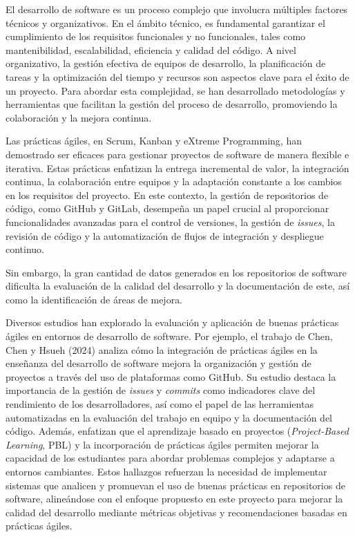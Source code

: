 
El desarrollo de software es un proceso complejo que involucra múltiples factores técnicos y organizativos. En el ámbito técnico, es fundamental garantizar el cumplimiento de los requisitos funcionales y no funcionales, tales como mantenibilidad, escalabilidad, eficiencia y calidad del código\cite{isoiec25000}. A nivel organizativo, la gestión efectiva de equipos de desarrollo, la planificación de tareas y la optimización del tiempo y recursos son aspectos clave para el éxito de un proyecto. Para abordar esta complejidad, se han desarrollado metodologías y herramientas que facilitan la gestión del proceso de desarrollo, promoviendo la colaboración y la mejora continua.

Las prácticas ágiles, en Scrum\cite{sutherland2014scrum}, Kanban\cite{roe2017kanban} y eXtreme Programming\cite{beck2004extreme}, han demostrado ser eficaces para gestionar proyectos de software de manera flexible e iterativa. Estas prácticas enfatizan la entrega incremental de valor, la integración continua, la colaboración entre equipos y la adaptación constante a los cambios en los requisitos del proyecto. En este contexto, la gestión de repositorios de código, como GitHub y GitLab, desempeña un papel crucial al proporcionar funcionalidades avanzadas para el control de versiones, la gestión de \textit{issues}, la revisión de código y la automatización de flujos de integración y despliegue continuo.

Sin embargo, la gran cantidad de datos generados en los repositorios de software dificulta la evaluación de la calidad del desarrollo y la documentación de este, así como la identificación de áreas de mejora. 

Diversos estudios han explorado la evaluación y aplicación de buenas prácticas ágiles en entornos de desarrollo de software. Por ejemplo, el trabajo de Chen, Chen y Hsueh (2024)\cite{Chen2024} analiza cómo la integración de prácticas ágiles en la enseñanza del desarrollo de software mejora la organización y gestión de proyectos a través del uso de plataformas como GitHub. Su estudio destaca la importancia de la gestión de \textit{issues} y \textit{commits} como indicadores clave del rendimiento de los desarrolladores, así como el papel de las herramientas automatizadas en la evaluación del trabajo en equipo y la documentación del código. Además, enfatizan que el aprendizaje basado en proyectos (\textit{Project-Based Learning}, PBL) y la incorporación de prácticas ágiles permiten mejorar la capacidad de los estudiantes para abordar problemas complejos y adaptarse a entornos cambiantes. Estos hallazgos refuerzan la necesidad de implementar sistemas que analicen y promuevan el uso de buenas prácticas en repositorios de software, alineándose con el enfoque propuesto en este proyecto para mejorar la calidad del desarrollo mediante métricas objetivas y recomendaciones basadas en prácticas ágiles.

